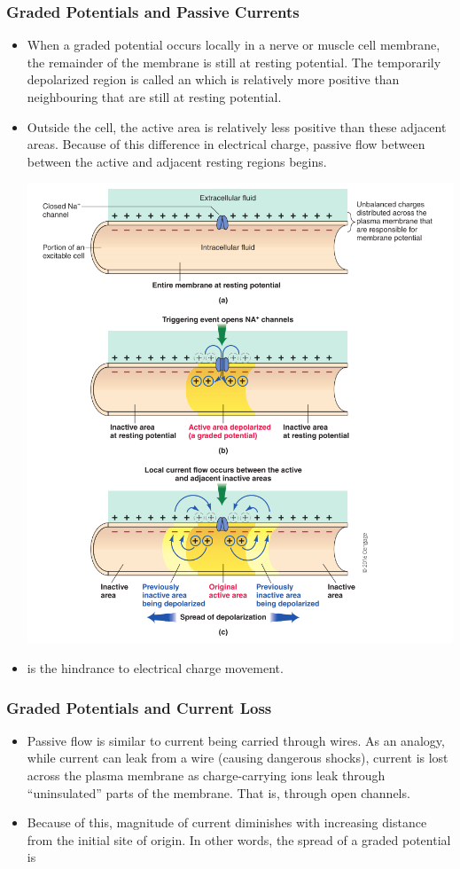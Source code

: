 \documentclass{article}
\numberwithin{equation}{section}
\begin{document}
\subsubsection{Graded Potentials and Passive Currents}
\begin{itemize}
    \item When a graded potential occurs locally in a nerve or muscle cell membrane, the remainder of the membrane is still at resting potential. The temporarily depolarized region is called an  which is relatively more positive than neighbouring  that are still at resting potential.
    \item Outside the cell, the active area is relatively less positive than these adjacent areas. Because of this difference in electrical charge, passive flow between between the active and adjacent resting regions begins.
    \begin{center}
        \includegraphics[width=0.7\linewidth]{figures/graded_potential.png}
    \end{center}
    \item {} is the hindrance to electrical charge movement.
\end{itemize}
\subsubsection{Graded Potentials and Current Loss}
\begin{itemize}
    \item Passive flow is similar to current being carried through wires. As an analogy, while current can leak from a wire (causing dangerous shocks), current is lost across the plasma membrane as charge-carrying ions leak through ``uninsulated'' parts of the membrane. That is, through open channels.
    \item Because of this, magnitude of current diminishes with increasing distance from the initial site of origin. In other words, the spread of a graded potential is 
\end{itemize}
\end{document}
